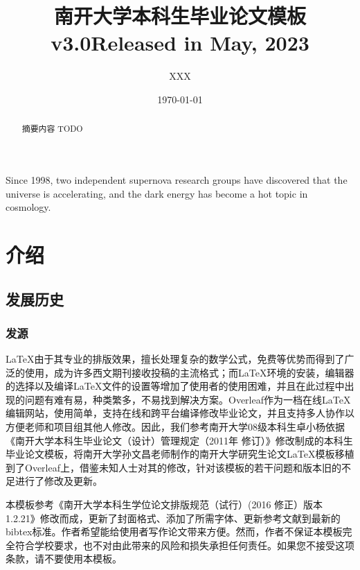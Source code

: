 \documentclass{nkuthesis}
\title{南开大学本科生毕业论文模板\\ v3.0}
\title*{Released in May, 2023}
\author{XXX}
\date{\today}
\begin{document}

\maketitle
\begin{titlepage}
  \declaration
\end{titlepage}

\begin{abstract}
摘要内容 TODO
\end{abstract}
  
\begin{abstract*}
Since 1998, two independent supernova research groups have discovered that the universe is accelerating, and the dark energy has become a hot topic in cosmology. 
\end{abstract*}

\tableofcontents


\section{介绍}

\subsection{发展历史}

\subsubsection{发源}

\LaTeX 由于其专业的排版效果，擅长处理复杂的数学公式，免费等优势而得到了广泛的使用，成为许多西文期刊接收投稿的主流格式；而\LaTeX 环境的安装，编辑器的选择以及编译\LaTeX 文件的设置等增加了使用者的使用困难，并且在此过程中出现的问题有难有易，种类繁多，不易找到解决方案。Overleaf作为一档在线\LaTeX 编辑网站，使用简单，支持在线和跨平台编译修改毕业论文，并且支持多人协作以方便老师和项目组其他人修改。因此，我们参考南开大学08级本科生卓小杨依据《南开大学本科生毕业论文（设计）管理规定（2011年 修订）》修改制成的本科生毕业论文模板，将南开大学孙文昌老师制作的南开大学研究生论文\LaTeX 模板移植到了Overleaf上，借鉴未知人士对其的修改，针对该模板的若干问题和版本旧的不足进行了修改及更新。

本模板参考《南开大学本科生学位论文排版规范（试行）(2016 修正）版本 1.2.21》修改而成，更新了封面格式、添加了所需字体、更新参考文献到最新的bibtex标准。作者希望能给使用者写作论文带来方便。然而，作者不保证本模板完全符合学校要求，也不对由此带来的风险和损失承担任何责任。如果您不接受这项条款，请不要使用本模板。
\end{document}
